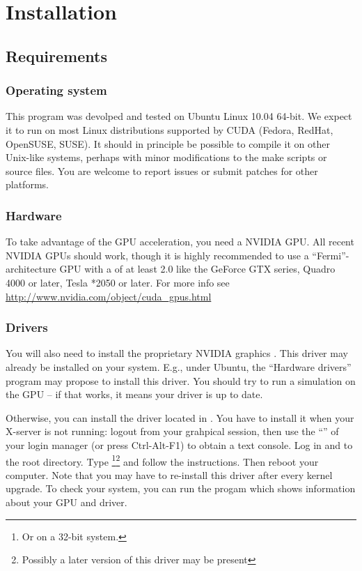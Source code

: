 \section{Installation}

\subsection{Requirements}

\subsubsection{Operating system}

This program was devolped and tested on Ubuntu Linux 10.04 64-bit. We expect it to run on most Linux distributions supported by CUDA (Fedora, RedHat, OpenSUSE, SUSE). It should in principle be possible to compile it on other Unix-like systems, perhaps with minor modifications to the make scripts or source files. You are welcome to report issues or submit patches for other platforms.

\subsubsection{Hardware}

To take advantage of the GPU acceleration, you need a  \textsc{NVIDIA} GPU. All recent \textsc{NVIDIA} GPUs should work, though it is highly recommended to use a ``Fermi''-architecture GPU with a  of at least 2.0 like the GeForce GTX series, Quadro 4000 or later, Tesla *2050 or later. For more info see \url{http://www.nvidia.com/object/cuda_gpus.html}

\subsubsection{Drivers}

You will also need to install the proprietary \textsc{NVIDIA} graphics . This driver may already be installed on your system. E.g., under Ubuntu, the ``Hardware drivers'' program may propose to install this driver. You should try to run a simulation on the GPU -- if that works, it means your driver is up to date.

Otherwise, you can install the driver located in . You have to install it when your X-server is not running: logout from your grahpical session, then use the ``'' of your login manager (or press Ctrl-Alt-F1) to obtain a text console. Log in and  to  the \prog root directory. Type \footnote{Or  on a 32-bit system.}\footnote{Possibly a later version of this driver may be present} and follow the instructions. Then reboot your computer. Note that you may have to re-install this driver after every kernel upgrade. To check your system, you can run the progam  which shows information about your GPU and driver.


